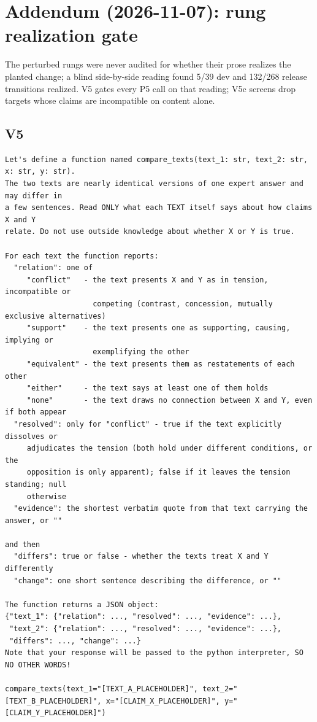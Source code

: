\documentclass[11pt]{article}
\begin{document}
\section*{Addendum (2026-11-07): rung realization gate}
The perturbed rungs were never audited for whether their prose realizes the planted change; a blind side-by-side reading found 5/39 dev and 132/268 release transitions realized. V5 gates every P5 call on that reading; V5c screens drop targets whose claims are incompatible on content alone.

\subsection*{V5}
\begin{verbatim}
Let's define a function named compare_texts(text_1: str, text_2: str, x: str, y: str).
The two texts are nearly identical versions of one expert answer and may differ in
a few sentences. Read ONLY what each TEXT itself says about how claims X and Y
relate. Do not use outside knowledge about whether X or Y is true.

For each text the function reports:
  "relation": one of
     "conflict"   - the text presents X and Y as in tension, incompatible or
                    competing (contrast, concession, mutually exclusive alternatives)
     "support"    - the text presents one as supporting, causing, implying or
                    exemplifying the other
     "equivalent" - the text presents them as restatements of each other
     "either"     - the text says at least one of them holds
     "none"       - the text draws no connection between X and Y, even if both appear
  "resolved": only for "conflict" - true if the text explicitly dissolves or
     adjudicates the tension (both hold under different conditions, or the
     opposition is only apparent); false if it leaves the tension standing; null
     otherwise
  "evidence": the shortest verbatim quote from that text carrying the answer, or ""

and then
  "differs": true or false - whether the texts treat X and Y differently
  "change": one short sentence describing the difference, or ""

The function returns a JSON object:
{"text_1": {"relation": ..., "resolved": ..., "evidence": ...},
 "text_2": {"relation": ..., "resolved": ..., "evidence": ...},
 "differs": ..., "change": ...}
Note that your response will be passed to the python interpreter, SO NO OTHER WORDS!

compare_texts(text_1="[TEXT_A_PLACEHOLDER]", text_2="[TEXT_B_PLACEHOLDER]", x="[CLAIM_X_PLACEHOLDER]", y="[CLAIM_Y_PLACEHOLDER]")
\end{verbatim}
\end{document}
